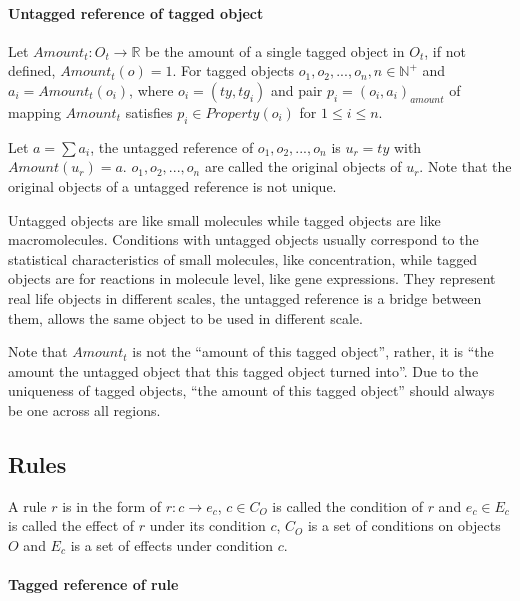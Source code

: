 \documentclass[9pt,a4paper,twoside]{article}
\begin{document}
            \paragraph{Untagged reference of tagged object}
            
                Let $Amount_t: O_t \rightarrow \mathbb{R}$ be the amount of a single tagged object in $O_t$, if not defined, $Amount_t(o) = 1$.
                For tagged objects $o_1, o_2,...,o_n, n \in \mathbb{N}^+$ and $a_i = Amount_t(o_i)$, where $o_i = (ty, tg_i)$ and pair $p_i=(o_i, a_i)_{amount}$ 
                of mapping $Amount_t$ satisfies $p_i \in Property(o_i)$ for $1 \leq i \leq n$.
            
                Let $a = \sum{a_i}$, the untagged reference of $o_1, o_2, ..., o_n$ is $u_r = ty$ with $Amount(u_r) = a$. $o_1, o_2, ..., o_n$ are called
                the original objects of $u_r$. Note that the original objects of a untagged reference is not unique.
            
                Untagged objects are like small molecules while tagged objects are like macromolecules. Conditions with untagged objects usually correspond to the
                statistical characteristics of small molecules, like concentration, while tagged objects are for reactions in molecule level, like gene expressions.
                They represent real life objects in different scales, the untagged reference is a bridge between them, allows the same object to be used in different
                scale. 
            
                Note that $Amount_t$ is not the ``amount of this tagged object'', rather, it is ``the amount the untagged object that this tagged object turned into''.
                Due to the uniqueness of tagged objects, ``the amount of this tagged object'' should always be one across all regions.
        
    \subsection{Rules}
    
        A rule $r$ is in the form of $r: c \rightarrow e_c$, $c \in C_O$ is called the condition of $r$ and $e_c \in E_c$ is called the effect of $r$ under its
        condition $c$, $C_O$ is a set of conditions on objects $O$ and $E_c$ is a set of effects under condition $c$.
    
        \paragraph{Tagged reference of rule}
            
\end{document}
